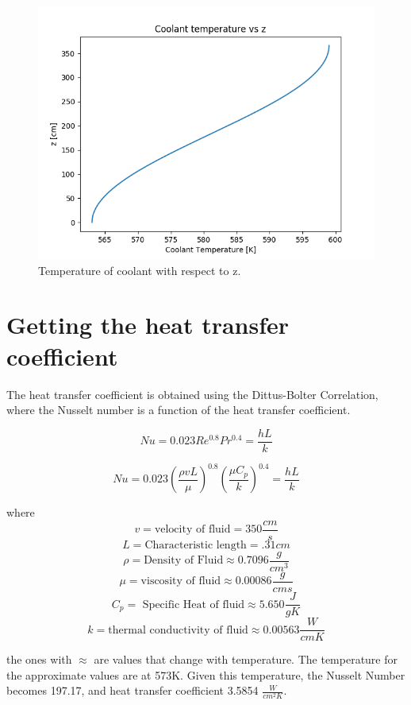 \documentclass[12pt,letterpaper]{article}
\begin{document}
\begin{figure}[htbp!]
    \begin{center}
        \includegraphics[scale=0.7]{t_c_z.png}
    \end{center}
    \caption{Temperature of coolant with respect to z.}
    \label{fig:t_c_z}
\end{figure}


\section*{Getting the heat transfer coefficient}
The heat transfer coefficient is obtained using the Dittus-Bolter Correlation,
where the Nusselt number is a function of the heat transfer coefficient.

\[ Nu = 0.023 Re^0.8 Pr^0.4 = \frac{h L}{k}\]

\[ Nu = 0.023 (\frac{\rho v L}{\mu})^{0.8} (\frac{\mu C_p}{k})^{0.4} = \frac{h L}{k}\]

where
\[v = \text{velocity of fluid} = 350 \frac{cm}{s}\]
\[L = \text{Characteristic length} = .31 cm \]
\[\rho = \text{Density of Fluid} \approx 0.7096 \frac{g}{cm^3}\]
\[\mu = \text{viscosity of fluid} \approx 0.00086 \frac{g}{cm s}\]
\[C_p = \text{ Specific Heat of fluid} \approx 5.650 \frac{J}{g K} \]
\[k = \text{thermal conductivity of fluid} \approx 0.00563\frac{W}{cm K} \]

the ones with $\approx$ are values that change with temperature. The temperature
for the approximate values are at 573K. Given this temperature, the Nusselt Number 
becomes 197.17, and heat transfer coefficient 3.5854 $\frac{W}{cm^2 K}$.
\end{document}
